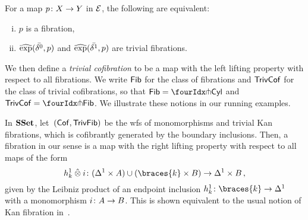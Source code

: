 \documentclass[reqno,10pt,a4paper,oneside,draft]{amsart}
\begin{document}
\begin{proposition} \label{thm:char-fib-nonalg} For a map $p \co X \to Y$ in $\cal{E}$, the following are equivalent:
\begin{enumerate}[(i)]
\item $p$ is a fibration,
\item $\hatexp(\bar{\lcyl}, p)$ and $\hatexp(\bar{\rcyl}, p)$ are trivial fibrations.
\end{enumerate}
\end{proposition} 

We then define a \emph{trivial cofibration} to be a map with the left lifting property with respect to all fibrations.
We write $\Fib$ for the class of fibrations and $\TrivCof$ for the class of trivial cofibrations, so that $\Fib = \liftr{\Cyl}$ and $\TrivCof = \liftl{\Fib}$.
We illustrate these notions in our running examples.

\begin{example} \label{thm:fib-is-kan}
In $\SSet$, let~$(\Cof, \TrivFib)$ be the wfs of monomorphisms and trivial Kan fibrations, which is cofibrantly generated by the boundary inclusions.
Then, a fibration in our sense is a map with the right lifting property with respect to all maps of the form
\[
h_k^1 \hatotimes i \co (\Delta^1 \times A) \cup (\braces{k} \times B) \to \Delta^1 \times B
\, ,\]
given by the Leibniz product of an endpoint inclusion $h_k^1 \co \braces{k} \to \Delta^1$ with a monomorphism $i \co A \to B$.
This is shown equivalent to the usual notion of Kan fibration in~\cite[Chap.~IV, Sec.~2]{gabriel-zisman:calculus-of-fractions}.
\end{example}
\end{document}
